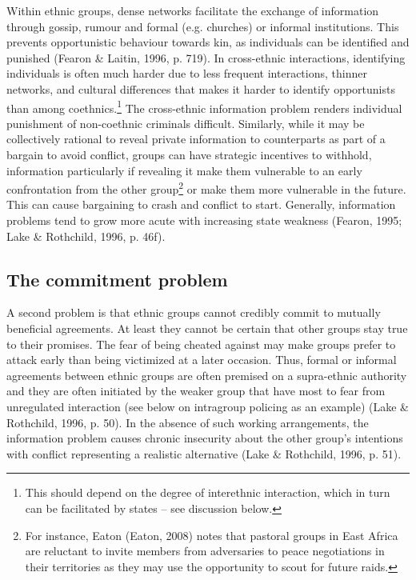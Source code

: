 \documentclass[12pt]{article}
\begin{document}
Within ethnic groups, dense networks facilitate the exchange of information
through gossip, rumour and formal (e.g. churches) or informal institutions. This
prevents opportunistic behaviour towards kin, as individuals can be identified
and punished (Fearon \& Laitin, 1996, p. 719). In cross-ethnic interactions,
identifying individuals is often much harder due to less frequent interactions,
thinner networks, and cultural differences that makes it harder to identify
opportunists than among coethnics.\footnote{This should depend on the degree of
interethnic interaction, which in turn can be facilitated by states – see
discussion below.} The cross-ethnic information problem renders individual
punishment of non-coethnic criminals difficult. Similarly, while it may be
collectively rational to reveal private information to counterparts as part of a
bargain to avoid conflict, groups can have strategic incentives to withhold,
information particularly if revealing it make them vulnerable to an early
confrontation from the other group\footnote{For instance, Eaton (Eaton, 2008)
	notes that pastoral groups in East Africa are reluctant to invite
	members from adversaries to peace negotiations in their territories as
they may use the opportunity to scout for future raids.} or make them more
vulnerable in the future. This can cause bargaining to crash and conflict to
start. Generally, information problems tend to grow more acute with increasing
state weakness (Fearon, 1995; Lake \& Rothchild, 1996, p. 46f).

\subsection{The commitment problem}

A second problem is that ethnic groups cannot credibly commit to mutually
beneficial agreements. At least they cannot be certain that other groups stay
true to their promises. The fear of being cheated against may make groups prefer
to attack early than being victimized at a later occasion. Thus, formal or
informal agreements between ethnic groups are often premised on a supra-ethnic
authority and they are often initiated by the weaker group that have most to
fear from unregulated interaction (see below on intragroup policing as an
example) (Lake \& Rothchild, 1996, p. 50). In the absence of such working
arrangements, the information problem causes chronic insecurity about the other
group’s intentions with conflict representing a realistic alternative (Lake \&
Rothchild, 1996, p. 51).
\end{document}
